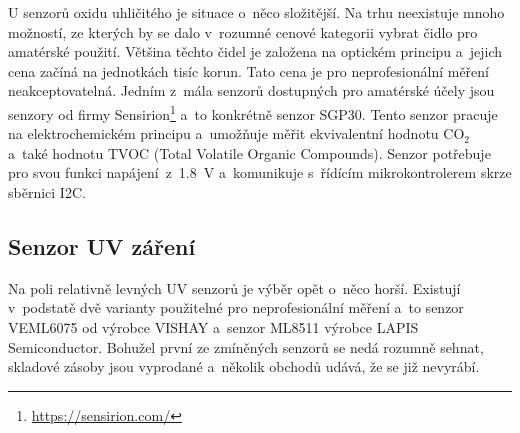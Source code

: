 U senzorů oxidu uhličitého je situace o~něco složitější. Na trhu neexistuje mnoho možností, ze kterých by se dalo v~rozumné cenové kategorii vybrat čidlo pro amatérské použití. Většina těchto čidel je založena na optickém principu a~jejich cena začíná na jednotkách tisíc korun. Tato cena je pro neprofesionální měření neakceptovatelná. Jedním z~mála senzorů dostupných pro amatérské účely jsou senzory od firmy Sensirion\footnote{\url{https://sensirion.com/}} a~to konkrétně senzor SGP30. Tento senzor pracuje na elektrochemickém principu a~umožňuje měřit ekvivalentní hodnotu CO$_2$ a~také hodnotu TVOC (Total Volatile Organic Compounds). Senzor potřebuje pro svou funkci napájení~z~\SI{1.8}{\volt} a~komunikuje s~řídícím mikrokontrolerem skrze sběrnici I2C.



\subsection{Senzor UV záření}

Na poli relativně levných UV senzorů je výběr opět o~něco horší. Existují v~podstatě dvě varianty použitelné pro neprofesionální měření a~to senzor VEML6075 od výrobce VISHAY a~senzor ML8511 výrobce LAPIS Semiconductor. Bohužel první ze zmíněných senzorů se nedá rozumně sehnat, skladové zásoby jsou vyprodané a~několik obchodů udává, že se již nevyrábí.

